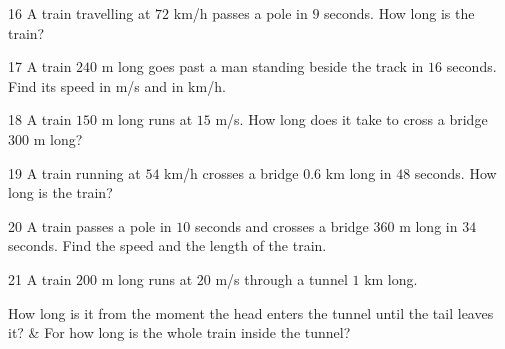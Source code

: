 \gap
\begin{probbox}{16}{\relax}
A train travelling at $72$ km/h passes a pole in $9$ seconds. How long is the train?
\end{probbox}
\gap
\begin{probbox}{17}{\relax}
A train $240$ m long goes past a man standing beside the track in $16$ seconds. Find its speed in m/s and in km/h.
\end{probbox}
\gap
\begin{probbox}{18}{\relax}
A train $150$ m long runs at $15$ m/s. How long does it take to cross a bridge $300$ m long?
\end{probbox}
\gap
\begin{probbox}{19}{\relax}
A train running at $54$ km/h crosses a bridge $0.6$ km long in $48$ seconds. How long is the train?
\end{probbox}
\gap
\begin{probbox}{20}{\relax}
A train passes a pole in $10$ seconds and crosses a bridge $360$ m long in $34$ seconds. Find the speed and the length of the train.
\end{probbox}
\gap
\begin{probbox}{21}{\relax}
A train $200$ m long runs at $20$ m/s through a tunnel $1$ km long.
\begin{cols2}
 How long is it from the moment the head enters the tunnel until the tail leaves it? &  For how long is the whole train inside the tunnel?
\end{cols2}
\end{probbox}
